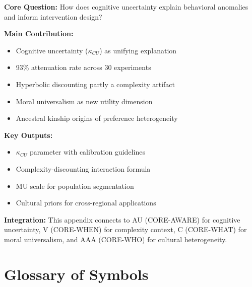 \begin{tcolorbox}[colback=green!10!white, colframe=green!75!black,
    title=\textbf{Appendix UNMAPPED_ENK: Summary}]

\textbf{Core Question:} How does cognitive uncertainty explain behavioral
anomalies and inform intervention design?

\textbf{Main Contribution:}
\begin{itemize}[nosep]
    \item Cognitive uncertainty ($\kappa_{CU}$) as unifying explanation
    \item 93\% attenuation rate across 30 experiments
    \item Hyperbolic discounting partly a complexity artifact
    \item Moral universalism as new utility dimension
    \item Ancestral kinship origins of preference heterogeneity
\end{itemize}

\textbf{Key Outputs:}
\begin{itemize}[nosep]
    \item $\kappa_{CU}$ parameter with calibration guidelines
    \item Complexity-discounting interaction formula
    \item MU scale for population segmentation
    \item Cultural priors for cross-regional applications
\end{itemize}

\textbf{Integration:} This appendix connects to AU (CORE-AWARE) for cognitive
uncertainty, V (CORE-WHEN) for complexity context, C (CORE-WHAT) for moral
universalism, and AAA (CORE-WHO) for cultural heterogeneity.

\end{tcolorbox}


\section{Glossary of Symbols}
\label{sec:enk-glossary}

